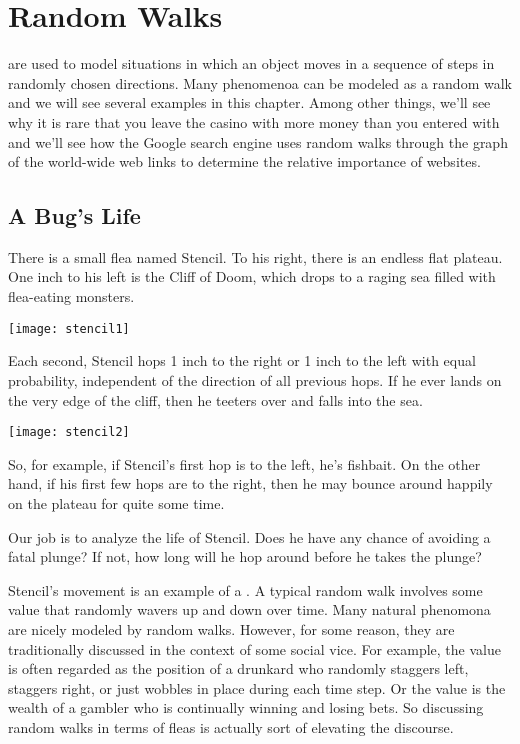 \chapter{Random Walks}\label{ran_process_chap}

 are used to model situations in which an object
moves in a sequence of steps in randomly chosen directions.  Many
phenomenoa can be modeled as a random walk and we will see several
examples in this chapter.  Among other things, we'll see why it is
rare that you leave the casino with more money than you entered with
and we'll see how the Google search engine uses random walks through
the graph of the world-wide web links to determine the relative
importance of websites.


\section{A Bug's Life}

There is a small flea named Stencil.  To his right, there is an
endless flat plateau.  One inch to his left is the Cliff of Doom,
which drops to a raging sea filled with flea-eating monsters.
%
\begin{center}
\texttt{[image: stencil1]}
\end{center}

Each second, Stencil hops 1 inch to the right or 1 inch to the left
with equal probability, independent of the direction of all previous
hops.  If he ever lands on the very edge of the cliff, then he teeters
over and falls into the sea.
%
\begin{center}
\texttt{[image: stencil2]}
\end{center}
%
So, for example, if Stencil's first hop is to the left, he's fishbait.
On the other hand, if his first few hops are to the right, then he may
bounce around happily on the plateau for quite some time.

Our job is to analyze the life of Stencil.  Does he have any chance of
avoiding a fatal plunge?  If not, how long will he hop around before
he takes the plunge?

Stencil's movement is an example of a .  A typical
random walk involves some value that randomly wavers up and down over
time.  Many natural phenomona are nicely modeled by random walks.
However, for some reason, they are traditionally discussed in the
context of some social vice.  For example, the value is often regarded
as the position of a drunkard who randomly staggers left, staggers
right, or just wobbles in place during each time step.  Or the value
is the wealth of a gambler who is continually winning and losing bets.
So discussing random walks in terms of fleas is actually sort of
elevating the discourse.

